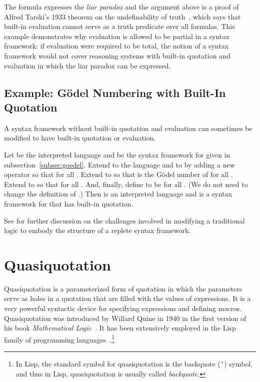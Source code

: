 \documentclass[11pt,fleqn]{article}
\newcommand{\bsp}{\begin{sloppypar}}
\newcommand{\esp}{\end{sloppypar}}
\begin{document}
The formula  expresses the \emph{liar paradox} and
the argument above is a proof of Alfred Tarski's 1933 theorem on the
undefinability of truth~\cite{Tarski33,Tarski35,Tarski35a}, which says
that built-in evaluation cannot serve as a truth predicate over all
formulas.  This example demonstrates why evaluation is allowed to be
partial in a syntax framework: if evaluation were required to be
total, the notion of a syntax framework would not cover reasoning
systems with built-in quotation and evaluation in which the liar
paradox can be expressed.

\subsection{Example: G\"odel Numbering with Built-In Quotation}

A syntax framework without built-in quotation and evaluation can
sometimes be modified to have built-in quotation or evaluation.

\bsp Let  be the
interpreted language and  be the
syntax framework for  given in subsection~\ref{subsec:goedel}.
Extend  to the language  and  to
 by adding a new operator  so that
 for all .
Extend  to  so that
 is the G\"odel number of  for all .
Extend  to  so that 
for all .  And, finally, define  to be
 for all .  (We do not need to
change the definition of .)  Then  is an interpreted
language and  is a syntax framework for 
that has built-in quotation. \esp

See \cite{Farmer13} for further discussion on the challenges involved
in modifying a traditional logic to embody the structure of a replete
syntax framework.

\section{Quasiquotation} \label{sec:quasiquotation}

Quasiquotation is a parameterized form of quotation in which the
parameters serve as holes in a quotation that are filled with the
values of expressions.  It is a very powerful syntactic device for
specifying expressions and defining macros.  Quasiquotation was
introduced by Willard Quine in 1940 in the first version of his book
\emph{Mathematical Logic}~\cite{Quine03}.  It has been extensively
employed in the Lisp family of programming
languages~\cite{Bawden99}.\footnote{In Lisp, the standard symbol for
  quasiquotation is the backquote (\texttt{`}) symbol, and thus in
  Lisp, quasiquotation is usually called \emph{backquote}.}
\end{document}
